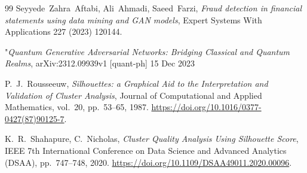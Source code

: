 \documentclass[a4paper]{article}
\begin{document}
\begin{thebibliography}{99}
 Seyyede~Zahra~Aftabi, Ali~Ahmadi, Saeed~Farzi, \textit{Fraud detection in financial statements using data mining and GAN models}, Expert Systems With Applications 227 (2023) 120144.

 "\textit{Quantum Generative Adversarial Networks: Bridging Classical and Quantum Realms}, arXiv:2312.09939v1 [quant-ph] 15 Dec 2023

P.~J.~Rousseeuw, \textit{Silhouettes: a Graphical Aid to the Interpretation and Validation of Cluster Analysis}, Journal of Computational and Applied Mathematics, vol.~20, pp.~53--65, 1987. \url{https://doi.org/10.1016/0377-0427(87)90125-7}.

K.~R.~Shahapure, C.~Nicholas, \textit{Cluster Quality Analysis Using Silhouette Score}, IEEE 7th International Conference on Data Science and Advanced Analytics (DSAA), pp.~747--748, 2020. \url{https://doi.org/10.1109/DSAA49011.2020.00096}.

\end{thebibliography}
\end{document}
